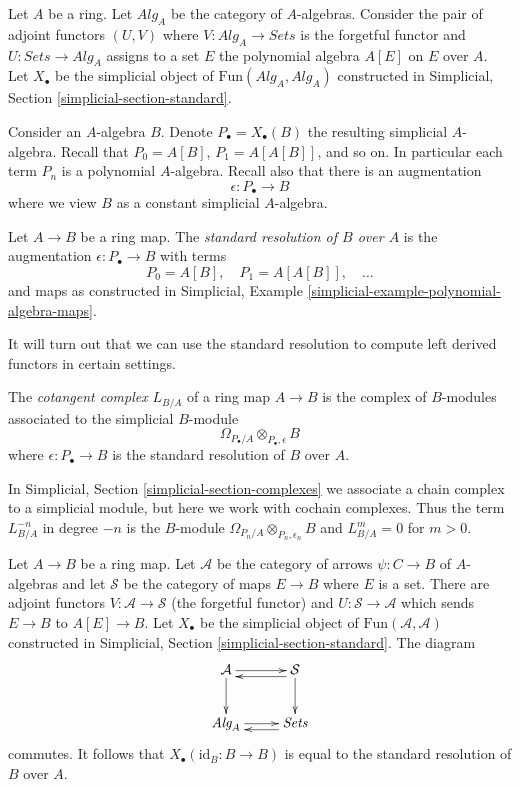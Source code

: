 \noindent
Let $A$ be a ring. Let $\textit{Alg}_A$ be the category of $A$-algebras.
Consider the pair of adjoint functors $(U, V)$ where
$V : \textit{Alg}_A \to \textit{Sets}$ is the forgetful functor and
$U : \textit{Sets} \to \textit{Alg}_A$ assigns to a set $E$ the polynomial
algebra $A[E]$ on $E$ over $A$. Let $X_\bullet$ be the simplicial object of
$\text{Fun}(\textit{Alg}_A, \textit{Alg}_A)$ constructed in
Simplicial, Section \ref{simplicial-section-standard}.

\medskip\noindent
Consider an $A$-algebra $B$. Denote $P_\bullet = X_\bullet(B)$ the resulting
simplicial $A$-algebra. Recall that $P_0 = A[B]$, $P_1 = A[A[B]]$, and so on.
In particular each term $P_n$ is a polynomial $A$-algebra.
Recall also that there is an augmentation
$$
\epsilon : P_\bullet \longrightarrow B
$$
where we view $B$ as a constant simplicial $A$-algebra.

\begin{definition}
\label{definition-standard-resolution}
Let $A \to B$ be a ring map. The {\it standard resolution of $B$ over $A$}
is the augmentation $\epsilon : P_\bullet \to B$ with terms
$$
P_0 = A[B],\quad P_1 = A[A[B]],\quad \ldots
$$
and maps as constructed in
Simplicial, Example \ref{simplicial-example-polynomial-algebra-maps}.
\end{definition}

\noindent
It will turn out that we can use the standard resolution
to compute left derived functors in certain settings.

\begin{definition}
\label{definition-cotangent-complex-ring-map}
The {\it cotangent complex} $L_{B/A}$ of a ring map $A \to B$
is the complex of $B$-modules associated to the simplicial $B$-module
$$
\Omega_{P_\bullet/A} \otimes_{P_\bullet, \epsilon} B
$$
where $\epsilon : P_\bullet \to B$ is the standard resolution
of $B$ over $A$.
\end{definition}

\noindent
In Simplicial, Section \ref{simplicial-section-complexes} we associate a
chain complex to a simplicial module, but here we work with cochain complexes.
Thus the term $L_{B/A}^{-n}$ in degree $-n$ is the $B$-module
$\Omega_{P_n/A} \otimes_{P_n, \epsilon_n} B$ and $L_{B/A}^m = 0$
for $m > 0$.

\begin{remark}
\label{remark-variant-cotangent-complex}
Let $A \to B$ be a ring map. Let $\mathcal{A}$ be the category of
arrows $\psi : C \to B$ of $A$-algebras and let $\mathcal{S}$ be
the category of maps $E \to B$ where $E$ is a set. There are adjoint
functors $V : \mathcal{A} \to \mathcal{S}$ (the forgetful functor)
and $U : \mathcal{S} \to \mathcal{A}$ which sends $E \to B$ to
$A[E] \to B$. Let $X_\bullet$ be the simplicial object of
$\text{Fun}(\mathcal{A}, \mathcal{A})$ constructed in
Simplicial, Section \ref{simplicial-section-standard}.
The diagram
$$
\xymatrix{
\mathcal{A} \ar[d] \ar[r] & \mathcal{S} \ar@<1ex>[l] \ar[d] \\
\textit{Alg}_A \ar[r] & \textit{Sets} \ar@<1ex>[l]
}
$$
commutes. It follows that $X_\bullet(\text{id}_B : B \to B)$
is equal to the standard resolution of $B$ over $A$.
\end{remark}


